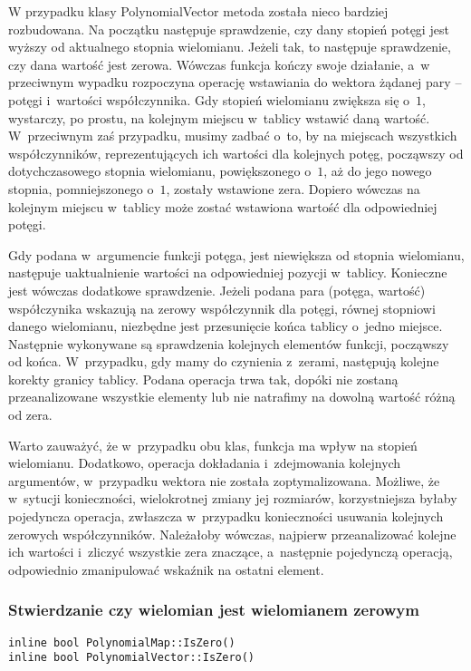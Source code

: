 W przypadku klasy PolynomialVector metoda została nieco bardziej rozbudowana. Na początku następuje sprawdzenie, czy dany stopień potęgi jest wyższy od aktualnego stopnia wielomianu. Jeżeli tak, to następuje sprawdzenie, czy dana wartość jest zerowa. Wówczas funkcja kończy swoje działanie, a~w przeciwnym wypadku rozpoczyna operację wstawiania do wektora żądanej pary – potęgi i~wartości współczynnika. Gdy stopień wielomianu zwiększa się o~$1$, wystarczy, po prostu, na kolejnym miejscu w~tablicy wstawić daną wartość. W~przeciwnym zaś przypadku, musimy zadbać o~to, by na miejscach wszystkich współczynników, reprezentujących ich wartości dla kolejnych potęg, począwszy od dotychczasowego stopnia wielomianu, powiększonego o~$1$, aż do jego nowego stopnia, pomniejszonego o~$1$, zostały wstawione zera. Dopiero wówczas na kolejnym miejscu w~tablicy może zostać wstawiona wartość dla odpowiedniej potęgi.

Gdy podana w~argumencie funkcji potęga, jest niewiększa od stopnia wielomianu, następuje uaktualnienie wartości na odpowiedniej pozycji w~tablicy. Konieczne jest wówczas dodatkowe sprawdzenie. Jeżeli podana para (potęga, wartość) współczynika wskazują na zerowy współczynnik dla potęgi, równej stopniowi danego wielomianu, niezbędne jest przesunięcie końca tablicy o~jedno miejsce. Następnie wykonywane są sprawdzenia kolejnych elementów funkcji, począwszy od końca. W~przypadku, gdy mamy do czynienia z~zerami, następują kolejne korekty granicy tablicy. Podana operacja trwa tak, dopóki nie zostaną przeanalizowane wszystkie elementy lub nie natrafimy na dowolną wartość różną od zera.

Warto zauważyć, że w~przypadku obu klas, funkcja ma wpływ na stopień wielomianu. Dodatkowo, operacja dokładania i~zdejmowania kolejnych argumentów, w~przypadku wektora nie została zoptymalizowana. Możliwe, że w~sytucji konieczności, wielokrotnej zmiany jej rozmiarów, korzystniejsza byłaby pojedyncza operacja, zwłaszcza w~przypadku konieczności usuwania kolejnych zerowych współczynników. Należałoby wówczas, najpierw przeanalizować kolejne ich wartości i~zliczyć wszystkie zera znaczące, a~następnie pojedynczą operacją, odpowiednio zmanipulować wskaźnik na ostatni element.

\subsubsection{Stwierdzanie czy wielomian jest wielomianem zerowym}
\begin{lstlisting}
inline bool PolynomialMap::IsZero()
inline bool PolynomialVector::IsZero()
\end{lstlisting}

